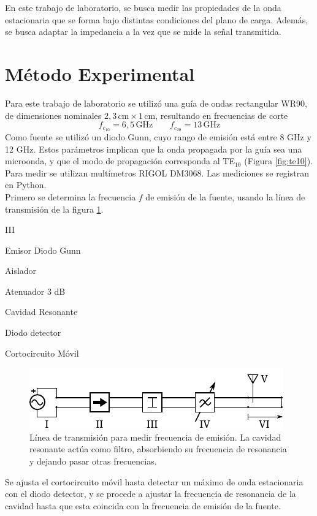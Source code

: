 \documentclass[11pt,a4paper]{article}
\begin{document}
\begin{multicols}{2}
En este trabajo de laboratorio, se busca medir las propiedades de la onda estacionaria que se forma bajo distintas condiciones del plano de carga. Además, se busca adaptar la impedancia a la vez que se mide la señal transmitida.
\section{Método Experimental}
Para este trabajo de laboratorio se utilizó una guía de ondas rectangular WR90, de dimensiones nominales $2,3\, \mathrm{cm} \times 1\, \mathrm{cm}$, resultando en frecuencias de corte
\begin{equation}
    f_{c_{10}} = 6,5\, \mathrm{GHz} \qquad f_{c_{20}}=13\,\mathrm{GHz}
\end{equation} 
Como fuente se utilizó un diodo Gunn, cuyo rango de emisión está entre 8 GHz y 12 GHz. 
Estos parámetros implican que la onda propagada por la guía sea una microonda, y que el modo de propagación corresponda al TE$_{10}$ (Figura \ref{fig:te10}).\\

Para medir se utilizan multímetros RIGOL DM3068. Las mediciones se registran en Python. \\


Primero se determina la frecuencia $f$ de emisión de la fuente, usando la línea de transmisión de la figura \ref{fig:arr1}.
\begin{multicols}{2}
    \begin{labeling}{III} 
        \item [I] Emisor Diodo Gunn
        \item [II] Aislador
        \item [III] Atenuador 3 dB
        \item [IV] Cavidad Resonante
        \item [V] Diodo detector
        \item [VI] Cortocircuito Móvil
    \end{labeling}        
\end{multicols}
\begin{figure}[H]
    \centering
    \includegraphics[width=0.9\linewidth]{Images/arreglo1.pdf}
    \caption{Línea de transmisión para medir frecuencia de emisión. La cavidad resonante actúa como filtro, absorbiendo su frecuencia de resonancia y dejando pasar otras frecuencias.}
    \label{fig:arr1}
\end{figure}
Se ajusta el cortocircuito móvil hasta detectar un máximo de onda estacionaria con el diodo detector, y se procede a ajustar la frecuencia de resonancia de la cavidad hasta que esta coincida con la frecuencia de emisión de la fuente.


\end{multicols}
\end{document}
